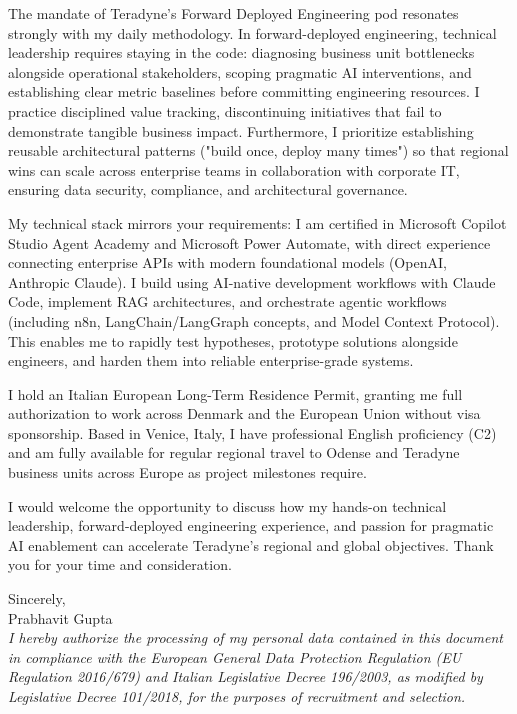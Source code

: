 \documentclass[10pt, a4paper]{article}
\begin{document}
The mandate of Teradyne's Forward Deployed Engineering pod resonates strongly with my daily methodology. In forward-deployed engineering, technical leadership requires staying in the code: diagnosing business unit bottlenecks alongside operational stakeholders, scoping pragmatic AI interventions, and establishing clear metric baselines before committing engineering resources. I practice disciplined value tracking, discontinuing initiatives that fail to demonstrate tangible business impact. Furthermore, I prioritize establishing reusable architectural patterns ("build once, deploy many times") so that regional wins can scale across enterprise teams in collaboration with corporate IT, ensuring data security, compliance, and architectural governance.

My technical stack mirrors your requirements: I am certified in Microsoft Copilot Studio Agent Academy and Microsoft Power Automate, with direct experience connecting enterprise APIs with modern foundational models (OpenAI, Anthropic Claude). I build using AI-native development workflows with Claude Code, implement RAG architectures, and orchestrate agentic workflows (including n8n, LangChain/LangGraph concepts, and Model Context Protocol). This enables me to rapidly test hypotheses, prototype solutions alongside engineers, and harden them into reliable enterprise-grade systems.

I hold an Italian European Long-Term Residence Permit, granting me full authorization to work across Denmark and the European Union without visa sponsorship. Based in Venice, Italy, I have professional English proficiency (C2) and am fully available for regular regional travel to Odense and Teradyne business units across Europe as project milestones require.

I would welcome the opportunity to discuss how my hands-on technical leadership, forward-deployed engineering experience, and passion for pragmatic AI enablement can accelerate Teradyne's regional and global objectives. Thank you for your time and consideration.

Sincerely,\\[12pt]
Prabhavit Gupta\\[18pt]

\textit{\small I hereby authorize the processing of my personal data contained in this document in compliance with the European General Data Protection Regulation (EU Regulation 2016/679) and Italian Legislative Decree 196/2003, as modified by Legislative Decree 101/2018, for the purposes of recruitment and selection.}
\end{document}
